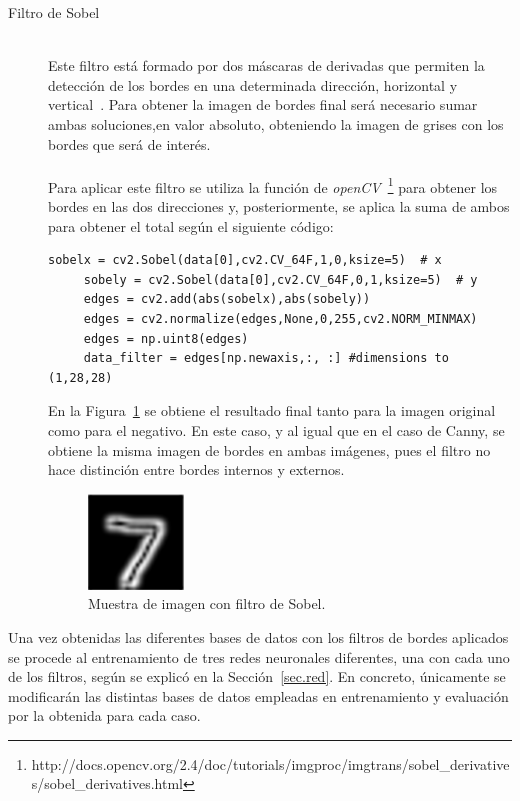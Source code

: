 \begin{description}
	
	\item[Filtro de Sobel] \hfill 
	\vspace{10pt}
	\\
	Este filtro está formado por dos máscaras de derivadas  que permiten la detección de los bordes en una determinada dirección, horizontal y vertical~\cite{sobel}. Para obtener la imagen de bordes final será necesario sumar ambas soluciones,en valor absoluto, obteniendo la imagen de grises con los bordes que será de interés.\\
	\vspace{-10pt}
	\\
	Para aplicar este filtro se utiliza la función de \textit{openCV}~\footnote{http://docs.opencv.org/2.4/doc/tutorials/imgproc/imgtrans/sobel\_derivatives/sobel\_derivatives.html} para obtener los bordes en las dos direcciones y, posteriormente, se aplica la suma de ambos para obtener el total según el siguiente código:
	\vspace{10pt}
	\begin{lstlisting}[frame=single]
	 sobelx = cv2.Sobel(data[0],cv2.CV_64F,1,0,ksize=5)  # x
	 sobely = cv2.Sobel(data[0],cv2.CV_64F,0,1,ksize=5)  # y
	 edges = cv2.add(abs(sobelx),abs(sobely))
	 edges = cv2.normalize(edges,None,0,255,cv2.NORM_MINMAX)
	 edges = np.uint8(edges)
	 data_filter = edges[np.newaxis,:, :] #dimensions to (1,28,28)
	\end{lstlisting}
	En la Figura~\ref{fig.sobel} se obtiene el resultado final tanto para la imagen original como para el negativo. En este caso, y al igual que en el caso de Canny, se obtiene la misma imagen de bordes en ambas imágenes, pues el filtro no hace distinción entre bordes internos y externos.
	
	\begin{figure}[H]
		\begin{center}
			\includegraphics[width=0.25\textwidth]{figures/sobel}
			\caption{Muestra de imagen con filtro de Sobel.}
			\label{fig.sobel}
		\end{center}
	\end{figure}	
\end{description}
Una vez obtenidas las diferentes bases de datos con los filtros de bordes aplicados se procede al entrenamiento de tres redes neuronales diferentes, una con cada uno de los filtros, según se explicó en la Sección~\ref{sec.red}. En concreto, únicamente se modificarán las distintas bases de datos empleadas en entrenamiento y evaluación por la obtenida para cada caso.\\

